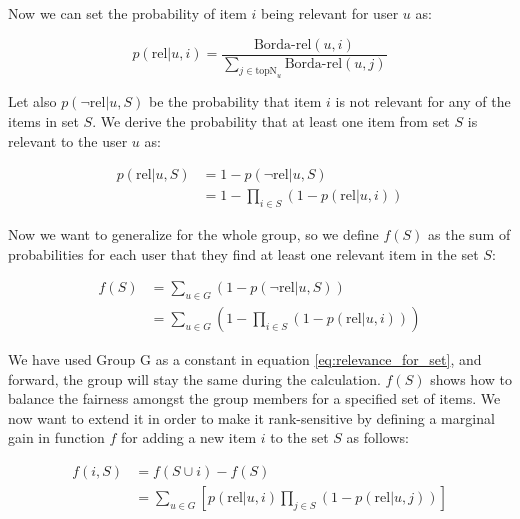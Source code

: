 Now we can set the probability of item $i$ being relevant for user $u$ as:

\begin{equation}
    p(\textrm{rel}|u, i) = \frac{\textrm{Borda-rel}(u, i)}{\sum_{j \in \textrm{topN}_u}{\textrm{Borda-rel}(u, j)}}
\end{equation}

Let also $p(\neg\textrm{rel}|u, S)$ be the probability that item $i$ is not relevant for any of the items in set $S$. We derive the probability that at least one item from set $S$ is relevant to the user $u$ as:

\begin{equation} \label{eq:atleast_one_relevant}
\begin{aligned}
    p(\textrm{rel}|u, S) &= 1 - p(\neg\textrm{rel}|u, S) \\
    & = 1 - \prod_{i \in S}{(1 - p(\textrm{rel}|u, i))}
\end{aligned}
\end{equation}

Now we want to generalize for the whole group, so we define $f(S)$ as the sum of probabilities for each user that they find at least one relevant item in the set $S$:

\begin{equation} \label{eq:relevance_for_set}
\begin{aligned}
    f(S) &= \sum_{u \in G}{\left(1 - p(\neg\textrm{rel}|u, S)\right)} \\
    & = \sum_{u \in G}{\left(1 - \prod_{i \in S}{(1 - p(\textrm{rel}|u, i))}\right)}
\end{aligned}
\end{equation}

We have used Group G as a constant in equation \ref{eq:relevance_for_set}, and forward, the group will stay the same during the calculation. $f(S)$ shows how to balance the fairness amongst the group members for a specified set of items. We now want to extend it in order to make it rank-sensitive by defining a marginal gain in function $f$ for adding a new item $i$ to the set $S$ as follows:

\begin{equation} \label{eq:relevance_for_set_add}
\begin{aligned}
    f(i, S) &= f(S \cup {i}) - f(S) \\
    & = \sum_{u \in G}{\left[p(\textrm{rel}|u, i) \prod_{j \in S}{(1 - p(\textrm{rel}|u, j))}\right]}
\end{aligned}
\end{equation}

